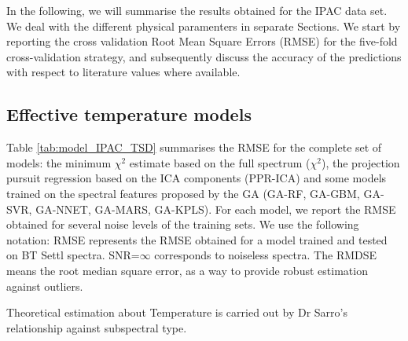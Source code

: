 
In the following, we will summarise the results obtained for the IPAC
data set. We deal with the different physical paramenters in separate
Sections. We start by reporting the cross validation Root Mean Square
Errors (RMSE) for the five-fold cross-validation strategy, and
subsequently discuss the accuracy of the predictions with respect to
literature values where available.

\subsection{Effective temperature models}

Table \ref{tab:model_IPAC_TSD} summarises the RMSE for the complete set of
models: the minimum $\chi^2$ estimate based on the full spectrum
($\chi^2$), the projection pursuit regression based on the ICA
components (PPR-ICA) and some models trained on the spectral
features proposed by the GA (GA-RF, 
GA-GBM, GA-SVR, GA-NNET, GA-MARS, GA-KPLS). For each model, we report
the RMSE obtained for several noise levels of the training sets. 
We use the following notation: RMSE represents the RMSE
obtained for a model trained and tested on BT Settl spectra. 
SNR=$\infty$ corresponds to noiseless spectra. 
The RMDSE means the root median square error, as a way to provide 
robust estimation against outliers.

Theoretical estimation about Temperature is carried out by Dr Sarro\textquoteright s 
relationship against subspectral type.

